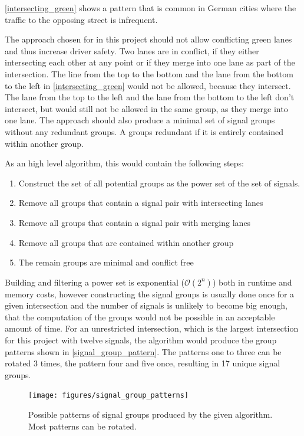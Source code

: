 \autoref{intersecting_green} shows a pattern that is common in German cities where the traffic to the opposing street is infrequent.

The approach chosen for in this project should not allow conflicting green lanes and thus increase driver safety. Two lanes are in conflict, if they either intersecting each other at any point or if they merge into one lane as part of the intersection. The line from the top to the bottom and the lane from the bottom to the left in \autoref{intersecting_green} would not be allowed, because they intersect. The lane from the top to the left and the lane from the bottom to the left don't intersect, but would still not be allowed in the same group, as they merge into one lane. The approach should also produce a minimal set of signal groups without any redundant groups. A groups redundant if it is entirely contained within another group.

As an high level algorithm, this would contain the following steps:

\begin{enumerate}
	\item Construct the set of all potential groups as the power set of the set of signals.
	\item Remove all groups that contain a signal pair with intersecting lanes
	\item Remove all groups that contain a signal pair with merging lanes
	\item Remove all groups that are contained within another group
	\item The remain groups are minimal and conflict free
\end{enumerate}

Building and filtering a power set is exponential ($\mathcal{O}(2^n)$) both in runtime and memory costs, however constructing the signal groups is usually done once for a given intersection and the number of signals is unlikely to become big enough, that the computation of the groups would not be possible in an acceptable amount of time. For an unrestricted intersection, which is the largest intersection for this project with twelve signals, the algorithm would produce the group patterns shown in \autoref{signal_group_pattern}. The patterns one to three can be rotated 3 times, the pattern four and five once, resulting in 17 unique signal groups.

\begin{figure}[ht!]
	\centering
	\texttt{[image: figures/signal\_group\_patterns]}
	\caption{Possible patterns of signal groups produced by the given algorithm. Most patterns can be rotated.}
	\label{signal_group_pattern}
\end{figure}

